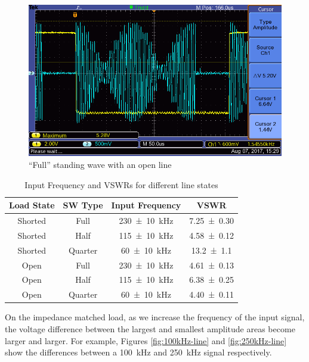 \documentclass[a4paper]{scrartcl}
\begin{document}
\begin{figure}
    \centering
    \includegraphics[width = 15cm]{data/ALL0016/F0016TEK.png}
    \caption{``Full'' standing wave with an open line}
    \label{fig:full-standing-wave-open}
\end{figure}

\begin{table}
    \centering
    \begin{tabular}{c | c | c | c}
        Load State & SW Type & Input Frequency & VSWR \\
        \hline
        Shorted & Full & \SI{230 \pm 10}{\kilo\hertz} & \SI{7.25 \pm 0.30}{} \\
        Shorted & Half & \SI{115 \pm 10}{\kilo\hertz} & \SI{4.58 \pm 0.12}{} \\
        Shorted & Quarter & \SI{60 \pm 10}{\kilo\hertz} & \SI{13.2 \pm 1.1}{} \\
        Open & Full & \SI{230 \pm 10}{\kilo\hertz} & \SI{4.61 \pm 0.13}{} \\
        Open & Half & \SI{115 \pm 10}{\kilo\hertz} & \SI{6.38 \pm 0.25}{} \\
        Open & Quarter & \SI{60 \pm 10}{\kilo\hertz} & \SI{4.40 \pm 0.11}{}
    \end{tabular}
    \caption{Input Frequency and VSWRs for different line states}
    \label{tab:vswr}
\end{table}

On the impedance matched load, as we increase the frequency of the input signal, the voltage difference between the largest and smallest amplitude areas become larger and larger. For example, Figures \ref{fig:100kHz-line} and \ref{fig:250kHz-line} show the differences between a \SI{100}{\kilo\hertz} and \SI{250}{\kilo\hertz} signal respectively.
\end{document}
